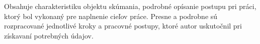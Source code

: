 \documentclass[../praca.tex]{subfiles}
\begin{document}
Obsahuje charakteristiku objektu skúmania, podrobné opísanie postupu pri práci,
ktorý bol vykonaný pre naplnenie cieľov práce. Presne a podrobne sú rozpracované
jednotlivé kroky a pracovné postupy, ktoré autor uskutočnil pri získavaní
potrebných údajov.
\end{document}
